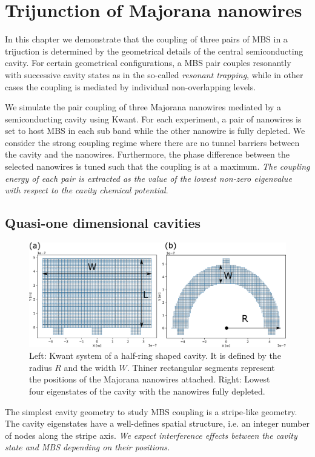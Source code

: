 \chapter{Trijunction of Majorana nanowires}

In this chapter we demonstrate that the coupling of three pairs of MBS in a trijuction is determined by the geometrical details of the central semiconducting cavity.
For certain geometrical configurations, a MBS pair couples resonantly with successive cavity states as in the so-called \textit{resonant trapping}, while in other cases the coupling is mediated by individual non-overlapping levels.

We simulate the pair coupling of three Majorana nanowires mediated by a semiconducting cavity using Kwant.
For each experiment, a pair of nanowires is set to host MBS in each sub band while the other nanowire is fully depleted.
We consider the strong coupling regime where there are no tunnel barriers between the cavity and the nanowires.
Furthermore, the phase difference between the selected nanowires is tuned such that the coupling is at a maximum.
\textit{The coupling energy of each pair is extracted as the value of the lowest non-zero eigenvalue with respect to the cavity chemical potential}.

\section{Quasi-one dimensional cavities}

\begin{figure}[h!]
\centering
  \includegraphics[width=0.7\linewidth]{figures/1d_cavities.pdf}
  \caption{Left: Kwant system of a half-ring shaped cavity. It is defined by the radius $R$ and the width $W$. Thiner rectangular segments represent the positions of the Majorana nanowires attached. Right: Lowest four eigenstates of the cavity with the nanowires fully depleted.}
  \label{fig:1d}
\end{figure}

The simplest cavity geometry to study MBS coupling is a stripe-like geometry.
The cavity eigenstates have a well-defines spatial structure, i.e. an integer number of nodes along the stripe axis.
\textit{We expect interference effects between the cavity state and MBS depending on their positions.}


